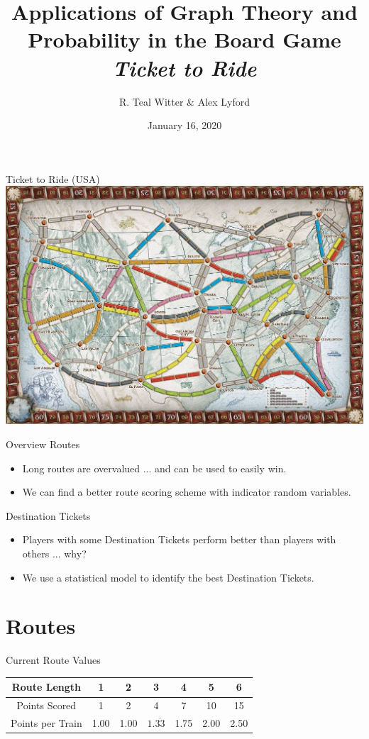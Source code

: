 \documentclass[12pt]{beamer}
\title{Applications of Graph Theory and Probability
in the Board Game \textit{Ticket to Ride}}
\author{R. Teal Witter \& Alex Lyford}
\institute{Middlebury College}
\date{January 16, 2020}
\begin{document}
\frame{\titlepage}

\begin{frame}{Ticket to Ride (USA)}
    \centering
    \includegraphics[scale=.3]{figures/board}
\end{frame}

\begin{frame}{Overview}
    Routes
    \begin{itemize}
        \item Long routes are overvalued ... and can 
        be used to easily win.
        \item We can find a better route scoring scheme 
        with indicator random variables.
    \end{itemize}
    
    Destination Tickets
    \begin{itemize}
        \item Players with some Destination Tickets perform
        better than players with others ... why?
        \item We use a statistical model to identify
        the best Destination Tickets.
    \end{itemize}
    
\end{frame}

\section{Routes}

\begin{frame}{Current Route Values}
    \begin{center}
    \renewcommand{\arraystretch}{2}
    \begin{tabular}{| c | c | c | c | c | c | c |}
    \hline
     Route Length & 1 & 2 & 3 & 4 & 5 & 6\\
     \hline
     Points Scored & 1 & 2 & 4 & 7 & 10 & 15\\
     \hline
     Points per Train & 1.00 & 1.00 & $1.\overline{33}$ 
     & 1.75 & 2.00 & 2.50\\
     \hline
    \end{tabular}
    \end{center}
\end{frame}
\end{document}
